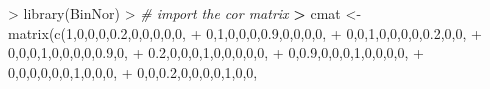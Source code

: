 \documentclass[
]{article}
\newenvironment{Shaded}{\begin{snugshade}}{\end{snugshade}}
\newcommand{\CommentTok}[1]{\textcolor[rgb]{0.56,0.35,0.01}{\textit{#1}}}
\newcommand{\DecValTok}[1]{\textcolor[rgb]{0.00,0.00,0.81}{#1}}
\newcommand{\ErrorTok}[1]{\textcolor[rgb]{0.64,0.00,0.00}{\textbf{#1}}}
\newcommand{\FloatTok}[1]{\textcolor[rgb]{0.00,0.00,0.81}{#1}}
\newcommand{\FunctionTok}[1]{\textcolor[rgb]{0.00,0.00,0.00}{#1}}
\newcommand{\NormalTok}[1]{#1}
\newcommand{\OtherTok}[1]{\textcolor[rgb]{0.56,0.35,0.01}{#1}}
\newcommand{\SpecialCharTok}[1]{\textcolor[rgb]{0.00,0.00,0.00}{#1}}
\begin{document}
\begin{Shaded}
\begin{Highlighting}[]
\SpecialCharTok{\textgreater{}} \FunctionTok{library}\NormalTok{(BinNor)}
\SpecialCharTok{\textgreater{}} \CommentTok{\# import the cor matrix}
\ErrorTok{\textgreater{}}\NormalTok{ cmat }\OtherTok{\textless{}{-}} \FunctionTok{matrix}\NormalTok{(}\FunctionTok{c}\NormalTok{(}\DecValTok{1}\NormalTok{,}\DecValTok{0}\NormalTok{,}\DecValTok{0}\NormalTok{,}\DecValTok{0}\NormalTok{,}\FloatTok{0.2}\NormalTok{,}\DecValTok{0}\NormalTok{,}\DecValTok{0}\NormalTok{,}\DecValTok{0}\NormalTok{,}\DecValTok{0}\NormalTok{,}\DecValTok{0}\NormalTok{,}
\SpecialCharTok{+}                \DecValTok{0}\NormalTok{,}\DecValTok{1}\NormalTok{,}\DecValTok{0}\NormalTok{,}\DecValTok{0}\NormalTok{,}\DecValTok{0}\NormalTok{,}\FloatTok{0.9}\NormalTok{,}\DecValTok{0}\NormalTok{,}\DecValTok{0}\NormalTok{,}\DecValTok{0}\NormalTok{,}\DecValTok{0}\NormalTok{,}
\SpecialCharTok{+}                \DecValTok{0}\NormalTok{,}\DecValTok{0}\NormalTok{,}\DecValTok{1}\NormalTok{,}\DecValTok{0}\NormalTok{,}\DecValTok{0}\NormalTok{,}\DecValTok{0}\NormalTok{,}\DecValTok{0}\NormalTok{,}\FloatTok{0.2}\NormalTok{,}\DecValTok{0}\NormalTok{,}\DecValTok{0}\NormalTok{,}
\SpecialCharTok{+}                \DecValTok{0}\NormalTok{,}\DecValTok{0}\NormalTok{,}\DecValTok{0}\NormalTok{,}\DecValTok{1}\NormalTok{,}\DecValTok{0}\NormalTok{,}\DecValTok{0}\NormalTok{,}\DecValTok{0}\NormalTok{,}\DecValTok{0}\NormalTok{,}\FloatTok{0.9}\NormalTok{,}\DecValTok{0}\NormalTok{,}
\SpecialCharTok{+}                \FloatTok{0.2}\NormalTok{,}\DecValTok{0}\NormalTok{,}\DecValTok{0}\NormalTok{,}\DecValTok{0}\NormalTok{,}\DecValTok{1}\NormalTok{,}\DecValTok{0}\NormalTok{,}\DecValTok{0}\NormalTok{,}\DecValTok{0}\NormalTok{,}\DecValTok{0}\NormalTok{,}\DecValTok{0}\NormalTok{,}
\SpecialCharTok{+}                \DecValTok{0}\NormalTok{,}\FloatTok{0.9}\NormalTok{,}\DecValTok{0}\NormalTok{,}\DecValTok{0}\NormalTok{,}\DecValTok{0}\NormalTok{,}\DecValTok{1}\NormalTok{,}\DecValTok{0}\NormalTok{,}\DecValTok{0}\NormalTok{,}\DecValTok{0}\NormalTok{,}\DecValTok{0}\NormalTok{,}
\SpecialCharTok{+}                \DecValTok{0}\NormalTok{,}\DecValTok{0}\NormalTok{,}\DecValTok{0}\NormalTok{,}\DecValTok{0}\NormalTok{,}\DecValTok{0}\NormalTok{,}\DecValTok{0}\NormalTok{,}\DecValTok{1}\NormalTok{,}\DecValTok{0}\NormalTok{,}\DecValTok{0}\NormalTok{,}\DecValTok{0}\NormalTok{,}
\SpecialCharTok{+}                \DecValTok{0}\NormalTok{,}\DecValTok{0}\NormalTok{,}\FloatTok{0.2}\NormalTok{,}\DecValTok{0}\NormalTok{,}\DecValTok{0}\NormalTok{,}\DecValTok{0}\NormalTok{,}\DecValTok{0}\NormalTok{,}\DecValTok{1}\NormalTok{,}\DecValTok{0}\NormalTok{,}\DecValTok{0}\NormalTok{,}

\end{Highlighting}
\end{Shaded}
\end{document}

